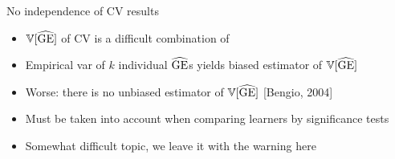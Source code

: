 

\begin{vbframe}{No independence of CV results}

\begin{itemize}
\item $\mathbb{V}[\widehat{\mathrm{GE}}]$ of CV is a difficult combination of 
\begin{itemize}
\end{itemize}
\item Empirical var of $k$ individual $\widehat{\mathrm{GE}}$s yields biased 
estimator of $\mathbb{V}[\widehat{\mathrm{GE}}]$ 
\item Worse: there is no unbiased estimator of $\mathbb{V}[\widehat{\mathrm{GE}}]$ [Bengio, 2004]
\item Must be taken into account when comparing learners by significance tests
\item Somewhat difficult topic, we leave it with the warning here

\end{itemize}
\end{vbframe}






